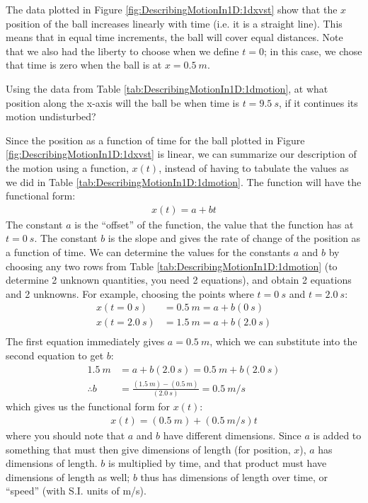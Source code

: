 The data plotted in Figure \ref{fig:DescribingMotionIn1D:1dxvst} show that the $x$ position of the ball increases linearly with time (i.e. it is a straight line). This means that in equal time increments, the ball will cover equal distances. Note that we also had the liberty to choose when we define $t=0$; in this case, we chose that time is zero when the ball is at $x=\SI{0.5}{m}$. 

\begin{checkpoint}{Using the data from Table \ref{tab:DescribingMotionIn1D:1dmotion}, at what position along the x-axis will the ball be when time is $t=\SI{9.5}{s}$, if it continues its motion undisturbed?} %
\end{checkpoint} 

Since the position as a function of time for the ball plotted in Figure \ref{fig:DescribingMotionIn1D:1dxvst} is linear, we can summarize our description of the motion using a function, $x(t)$, instead of having to tabulate the values as we did in Table \ref{tab:DescribingMotionIn1D:1dmotion}. The function will have the functional form:
\begin{align*}
x(t) = a + b t
\end{align*}
The constant $a$ is the ``offset'' of the function, the value that the function has at $t=\SI{0}{s}$. The constant $b$ is the slope and gives the rate of change of the position as a function of time. We can determine the values for the constants $a$ and $b$ by choosing any two rows from Table \ref{tab:DescribingMotionIn1D:1dmotion} (to determine 2 unknown quantities, you need 2 equations), and obtain 2 equations and 2 unknowns. For example, choosing the points where $t=\SI{0}{s}$ and $t=\SI{2.0}{s}$:
\begin{align*}
x(t=\SI{0}{s})&=\SI{0.5}{m}=a + b(\SI{0}{s}) \\
x(t=\SI{2.0}{s})&=\SI{1.5}{m}=a + b(\SI{2.0}{s}) \\
\end{align*}
The first equation immediately gives $a = \SI{0.5}{m}$, which we can substitute into the second equation to get $b$:
\begin{align*}
\SI{1.5}{m}&=a + b(\SI{2.0}{s}) = \SI{0.5}{m} + b(\SI{2.0}{s})\\
\therefore b &=\frac{(\SI{1.5}{m})-(\SI{0.5}{m})}{(\SI{2.0}{s})}=\SI{0.5}{m/s}
\end{align*}
which gives us the functional form for $x(t)$:
\begin{align*}
x(t) = (\SI{0.5}{m}) + (\SI{0.5}{m/s}) t
\end{align*}
where you should note that $a$ and $b$ have different dimensions. Since $a$ is added to something that must then give dimensions of length (for position, $x$), $a$ has dimensions of length. $b$ is multiplied by time, and that product must have dimensions of length as well; $b$ thus has dimensions of length over time, or ``speed'' (with S.I. units of \si{m/s}).

